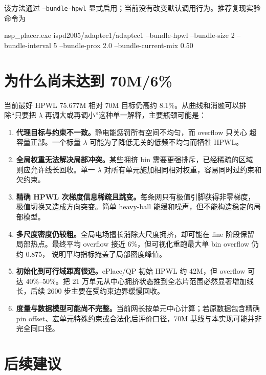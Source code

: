 \documentclass[UTF8,fontset=windows,a4paper,11pt]{ctexart}
\begin{document}
该方法通过 \texttt{--bundle-hpwl} 显式启用；当前没有改变默认调用行为。推荐复现实验命令为
\begin{center}
\small\ttfamily
nsp\_placer.exe ispd2005/adaptec1/adaptec1 --bundle-hpwl --bundle-size 2
--bundle-interval 5 --bundle-prox 2.0 --bundle-current-mix 0.50
\end{center}

\section{为什么尚未达到 70M/6\%}

当前最好 HPWL 75.677M 相对 70M 目标仍高约 8.1\%。从曲线和消融可以排除``只要把
$\lambda$ 再调大或再调小''这种单一解释，主要瓶颈可能是：

\begin{enumerate}
  \item \textbf{代理目标与约束不一致。}静电能惩罚所有空间不均匀，而 overflow 只关心
  超容量正部。一个标量 $\lambda$ 可能为了降低无关的低频不均匀而牺牲 HPWL。
  \item \textbf{全局权重无法解决局部冲突。}某些拥挤 bin 需要更强排斥，已经稀疏的区域
  则应允许线长回收。单一 $\lambda$ 对所有单元施加相同相对权重，容易同时过约束和欠约束。
  \item \textbf{精确 HPWL 次梯度信息稀疏且跳变。}每条网只有极值引脚获得非零梯度，
  极值切换又造成方向突变。简单 heavy-ball 能缓和噪声，但不能构造稳定的局部模型。
  \item \textbf{多尺度密度仍较粗。}全局电场擅长消除大尺度拥挤，却可能在 fine 阶段保留
  局部热点。最终平均 overflow 接近 6\%，但可视化重跑最大单 bin overflow 仍约 0.875，
  说明平均指标掩盖了局部密度峰值。
  \item \textbf{初始化到可行域距离很远。}ePlace/QP 初始 HPWL 约 42M，但 overflow 可达
  40\%--50\%。把 21 万单元从中心拥挤状态推到全芯片范围必然显著增加线长，后续 2600
  步主要在受约束边界缓慢回收。
  \item \textbf{度量与数据模型可能尚不完整。}当前网长按单元中心计算；若原数据包含精确
  pin offset、宏单元特殊约束或合法化后评价口径，70M 基线与本实现可能并非完全同口径。
\end{enumerate}

\section{后续建议}
\end{document}
